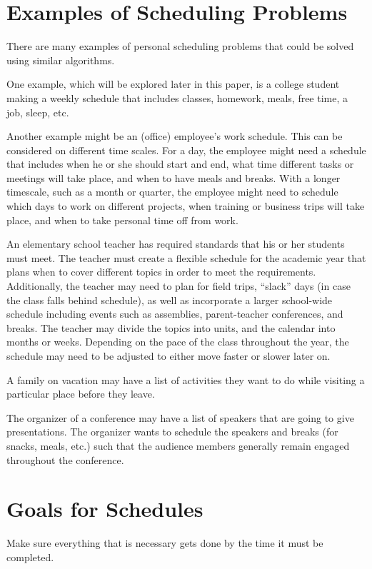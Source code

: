 \documentclass{article}
\begin{document}
\newpage
\section{Examples of Scheduling Problems}
	There are many examples of personal scheduling problems that could be solved using similar algorithms.

	One example, which will be explored later in this paper, is a college student making a weekly schedule that includes classes, homework, meals, free time, a job, sleep, etc.

	Another example might be an (office) employee's work schedule. This can be considered on different time scales. For a day, the employee might need a schedule that includes when he or she should start and end, what time different tasks or meetings will take place, and when to have meals and breaks. With a longer timescale, such as a month or quarter, the employee might need to schedule which days to work on different projects, when training or business trips will take place, and when to take personal time off from work.

	An elementary school teacher has required standards that his or her students must meet. The teacher must create a flexible schedule for the academic year that plans when to cover different topics in order to meet the requirements. Additionally, the teacher may need to plan for field trips, ``slack'' days (in case the class falls behind schedule), as well as incorporate a larger school-wide schedule including events such as assemblies, parent-teacher conferences, and breaks. The teacher may divide the topics into units, and the calendar into months or weeks. Depending on the pace of the class throughout the year, the schedule may need to be adjusted to either move faster or slower later on.

	A family on vacation may have a list of activities they want to do while visiting a particular place before they leave.

	The organizer of a conference may have a list of speakers that are going to give presentations. The organizer wants to schedule the speakers and breaks (for snacks, meals, etc.) such that the audience members generally remain engaged throughout the conference.

\newpage
\section{Goals for Schedules}
	Make sure everything that is necessary gets done by the time it must be completed.
\end{document}
